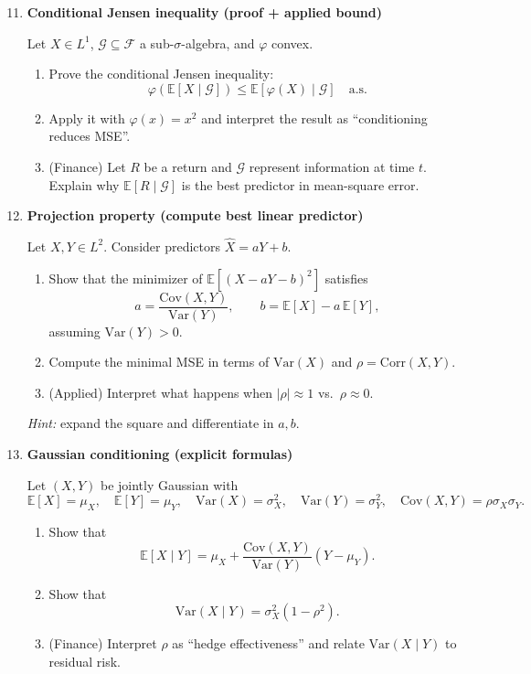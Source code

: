 \documentclass[11pt]{article}
\begin{document}
\begin{enumerate}
\setcounter{enumi}{10}

\item \textbf{Conditional Jensen inequality (proof + applied bound)}

Let $X\in L^1$, $\mathcal{G}\subseteq\mathcal{F}$ a sub-$\sigma$-algebra, and $\varphi$ convex.
\begin{enumerate}
\item Prove the conditional Jensen inequality:
\[
\varphi(\mathbb{E}[X\mid \mathcal{G}])\le \mathbb{E}[\varphi(X)\mid \mathcal{G}]
\quad\text{a.s.}
\]
\item Apply it with $\varphi(x)=x^2$ and interpret the result as ``conditioning reduces MSE''.
\item (Finance) Let $R$ be a return and $\mathcal{G}$ represent information at time $t$.
Explain why $\mathbb{E}[R\mid\mathcal{G}]$ is the best predictor in mean-square error.
\end{enumerate}

\bigskip

\item \textbf{Projection property (compute best linear predictor)}

Let $X,Y\in L^2$. Consider predictors $\hat X=aY+b$.
\begin{enumerate}
\item Show that the minimizer of $\mathbb{E}[(X-aY-b)^2]$ satisfies
\[
a=\frac{\mathrm{Cov}(X,Y)}{\mathrm{Var}(Y)},\qquad b=\mathbb{E}[X]-a\,\mathbb{E}[Y],
\]
assuming $\mathrm{Var}(Y)>0$.
\item Compute the minimal MSE in terms of $\mathrm{Var}(X)$ and $\rho=\mathrm{Corr}(X,Y)$.
\item (Applied) Interpret what happens when $|\rho|\approx 1$ vs.\ $\rho\approx 0$.
\end{enumerate}
\emph{Hint:} expand the square and differentiate in $a,b$.

\bigskip

\item \textbf{Gaussian conditioning (explicit formulas)}

Let $(X,Y)$ be jointly Gaussian with
\[
\mathbb{E}[X]=\mu_X,\quad \mathbb{E}[Y]=\mu_Y,\quad
\mathrm{Var}(X)=\sigma_X^2,\quad \mathrm{Var}(Y)=\sigma_Y^2,\quad
\mathrm{Cov}(X,Y)=\rho\sigma_X\sigma_Y.
\]
\begin{enumerate}
\item Show that
\[
\mathbb{E}[X\mid Y]=\mu_X+\frac{\mathrm{Cov}(X,Y)}{\mathrm{Var}(Y)}(Y-\mu_Y).
\]
\item Show that
\[
\mathrm{Var}(X\mid Y)=\sigma_X^2(1-\rho^2).
\]
\item (Finance) Interpret $\rho$ as ``hedge effectiveness'' and relate $\mathrm{Var}(X\mid Y)$ to residual risk.
\end{enumerate}


\end{enumerate}
\end{document}
